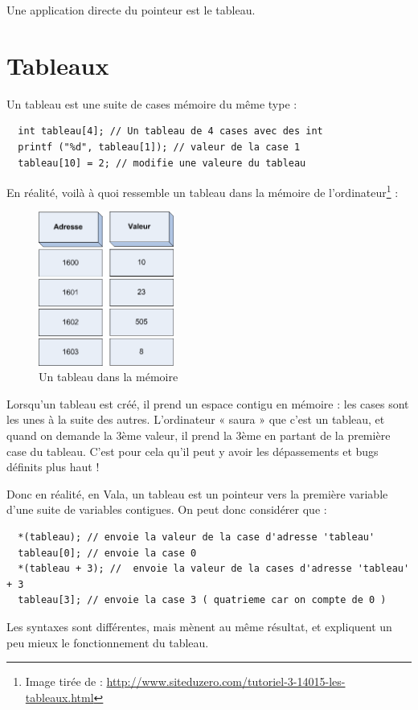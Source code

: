 Une application directe du pointeur est le tableau.

\section{Tableaux}
\label{DefTableaux}
Un tableau est une suite de cases mémoire du même type : 
\begin{lstlisting}
  int tableau[4]; // Un tableau de 4 cases avec des int
  printf ("%d", tableau[1]); // valeur de la case 1
  tableau[10] = 2; // modifie une valeure du tableau
\end{lstlisting}

En réalité, voilà à quoi ressemble un tableau dans la mémoire de l'ordinateur\footnote{Image tirée de : \url{http://www.siteduzero.com/tutoriel-3-14015-les-tableaux.html}} : 
\begin{figure}[H]
	\begin{center}
	  \includegraphics[width=12em]{Annexes/Images/tableau.png}
	\end{center}
	\caption{Un tableau dans la mémoire}
\end{figure}

Lorsqu'un tableau est créé, il prend un espace contigu en mémoire : les cases sont les unes à la suite des autres. L'ordinateur « saura » que c'est un tableau, et quand on demande la 3ème valeur, il prend la 3ème en partant de la première case du tableau. C'est pour cela qu'il peut y avoir les dépassements et bugs définits plus haut !

Donc en réalité, en Vala, un tableau est un pointeur vers la première variable d'une suite de variables contigues. On peut donc considérer que : 
\begin{lstlisting}
  *(tableau); // envoie la valeur de la case d'adresse 'tableau'
  tableau[0]; // envoie la case 0
  *(tableau + 3); //  envoie la valeur de la cases d'adresse 'tableau' + 3
  tableau[3]; // envoie la case 3 ( quatrieme car on compte de 0 )
\end{lstlisting}
Les syntaxes sont différentes, mais mènent au même résultat, et expliquent un peu mieux le fonctionnement du tableau.


